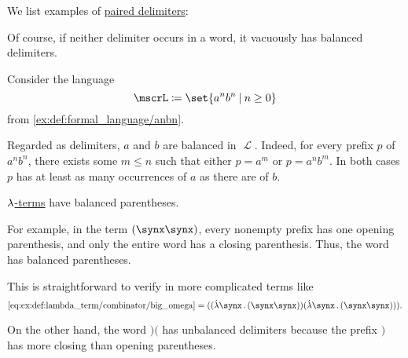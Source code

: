 \begin{example}\label{ex:def:paired_delimiters}
  We list examples of \hyperref[def:paired_delimiters]{paired delimiters}:
  \begin{thmenum}
     Of course, if neither delimiter occurs in a word, it vacuously has balanced delimiters.

     Consider the language
    \begin{equation*}
      \mscrL \coloneqq \set{ a^n b^n \given n \geq 0 }
    \end{equation*}
    from \cref{ex:def:formal_language/anbn}.

    Regarded as delimiters, \( a \) and \( b \) are balanced in \( \mscrL \). Indeed, for every prefix \( p \) of \( a^n b^n \), there exists some \( m \leq n \) such that either \( p = a^m \) or \( p = a^n b^m \). In both cases \( p \) has at least as many occurrences of \( a \) as there are of \( b \).

     \hyperref[def:lambda_term]{\( {\mathrm \lambda} \)-terms} have balanced parentheses.

    For example, in the term \( (\synx \synx) \), every nonempty prefix has one opening parenthesis, and only the entire word has a closing parenthesis. Thus, the word has balanced parentheses.

    This is straightforward to verify in more complicated terms like
    \begin{equation*}
      \ref{eq:ex:def:lambda_term/combinator/big_omega} = ((\qabs \synx (\synx \synx)) (\qabs \synx (\synx \synx))).
    \end{equation*}

     On the other hand, the word \( )( \) has unbalanced delimiters because the prefix \( ) \) has more closing than opening parentheses.
  \end{thmenum}
\end{example}

